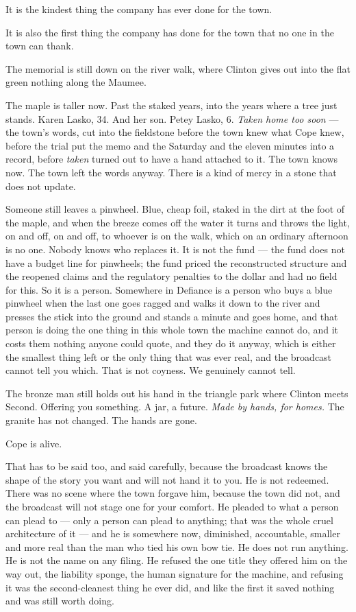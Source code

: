 \documentclass[11pt,openany]{book}
\newcommand{\scenebreak}{\par\vspace{0.5\baselineskip}\begin{center}\textasteriskcentered\quad\textasteriskcentered\quad\textasteriskcentered\end{center}\vspace{0.5\baselineskip}\par}
\begin{document}
It is the kindest thing the company has ever done for the town.

It is also the first thing the company has done for the town that no one in the town can thank.


\scenebreak


The memorial is still down on the river walk, where Clinton gives out into the flat green nothing along the Maumee.

The maple is taller now. Past the staked years, into the years where a tree just stands. Karen Lasko, 34. And her son. Petey Lasko, 6. \textit{Taken home too soon} --- the town's words, cut into the fieldstone before the town knew what Cope knew, before the trial put the memo and the Saturday and the eleven minutes into a record, before \textit{taken} turned out to have a hand attached to it. The town knows now. The town left the words anyway. There is a kind of mercy in a stone that does not update.

Someone still leaves a pinwheel. Blue, cheap foil, staked in the dirt at the foot of the maple, and when the breeze comes off the water it turns and throws the light, on and off, on and off, to whoever is on the walk, which on an ordinary afternoon is no one. Nobody knows who replaces it. It is not the fund --- the fund does not have a budget line for pinwheels; the fund priced the reconstructed structure and the reopened claims and the regulatory penalties to the dollar and had no field for this. So it is a person. Somewhere in Defiance is a person who buys a blue pinwheel when the last one goes ragged and walks it down to the river and presses the stick into the ground and stands a minute and goes home, and that person is doing the one thing in this whole town the machine cannot do, and it costs them nothing anyone could quote, and they do it anyway, which is either the smallest thing left or the only thing that was ever real, and the broadcast cannot tell you which. That is not coyness. We genuinely cannot tell.

The bronze man still holds out his hand in the triangle park where Clinton meets Second. Offering you something. A jar, a future. \textit{Made by hands, for homes.} The granite has not changed. The hands are gone.


\scenebreak


Cope is alive.

That has to be said too, and said carefully, because the broadcast knows the shape of the story you want and will not hand it to you. He is not redeemed. There was no scene where the town forgave him, because the town did not, and the broadcast will not stage one for your comfort. He pleaded to what a person can plead to --- only a person can plead to anything; that was the whole cruel architecture of it --- and he is somewhere now, diminished, accountable, smaller and more real than the man who tied his own bow tie. He does not run anything. He is not the name on any filing. He refused the one title they offered him on the way out, the liability sponge, the human signature for the machine, and refusing it was the second-cleanest thing he ever did, and like the first it saved nothing and was still worth doing.
\end{document}
